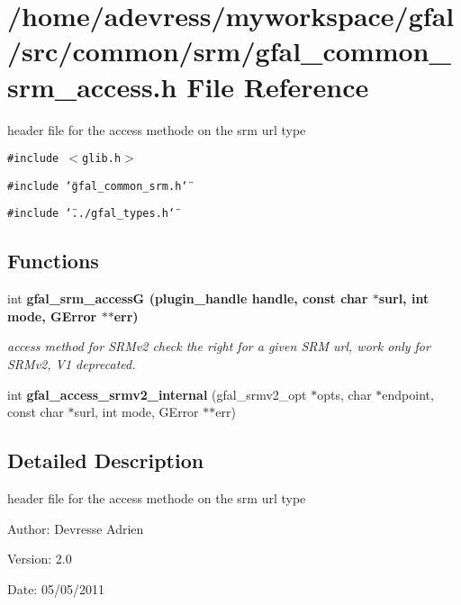 \section{/home/adevress/myworkspace/gfal/src/common/srm/gfal\_\-common\_\-srm\_\-access.h File Reference}
\label{gfal__common__srm__access_8h}
header file for the access methode on the srm url type 

{\tt \#include $<$glib.h$>$}\par
{\tt \#include \char`\"{}gfal\_\-common\_\-srm.h\char`\"{}}\par
{\tt \#include \char`\"{}../gfal\_\-types.h\char`\"{}}\par
\subsection*{Functions}
\begin{CompactItemize}
\item 
int \bf{gfal\_\-srm\_\-access\-G} (plugin\_\-handle handle, const char $\ast$surl, int mode, GError $\ast$$\ast$err)
\begin{CompactList}\small\item\em access method for SRMv2 check the right for a given SRM url, work only for SRMv2, V1 deprecated. \item\end{CompactList}\item 
int \textbf{gfal\_\-access\_\-srmv2\_\-internal} (gfal\_\-srmv2\_\-opt $\ast$opts, char $\ast$endpoint, const char $\ast$surl, int mode, GError $\ast$$\ast$err)\label{gfal__common__srm__access_8h_482394e183f4026d547f17575dc4b8dd}

\end{CompactItemize}


\subsection{Detailed Description}
header file for the access methode on the srm url type 

\begin{Desc}
\item[Author:]Devresse Adrien \end{Desc}
\begin{Desc}
\item[Version:]2.0 \end{Desc}
\begin{Desc}
\item[Date:]05/05/2011 \end{Desc}


